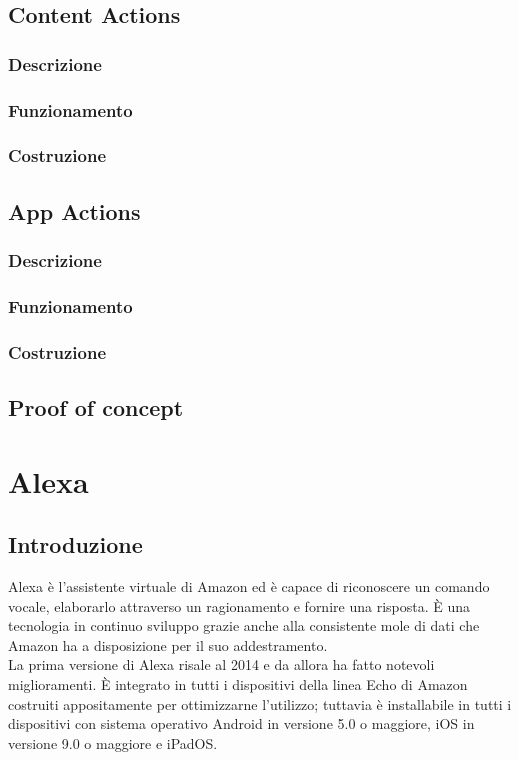 	\subsection{Content Actions}
		\subsubsection{Descrizione}
		\subsubsection{Funzionamento}
		\subsubsection{Costruzione}
	\subsection{App Actions}
		\subsubsection{Descrizione}
		\subsubsection{Funzionamento}
		\subsubsection{Costruzione}
	\subsection{Proof of concept}	

\section{Alexa}
	\subsection{Introduzione}
	Alexa è l'assistente virtuale di Amazon ed è capace di riconoscere un comando vocale, elaborarlo attraverso un ragionamento e fornire una risposta. È una tecnologia in continuo sviluppo grazie anche alla consistente mole di dati che Amazon ha a disposizione per il suo addestramento. \\
	La prima versione di Alexa risale al 2014 e da allora ha fatto notevoli miglioramenti. È integrato in tutti i dispositivi della linea Echo di Amazon costruiti appositamente per ottimizzarne l'utilizzo; tuttavia è installabile in tutti i dispositivi con sistema operativo Android in versione 5.0 o maggiore, iOS in versione 9.0 o maggiore e iPadOS.
